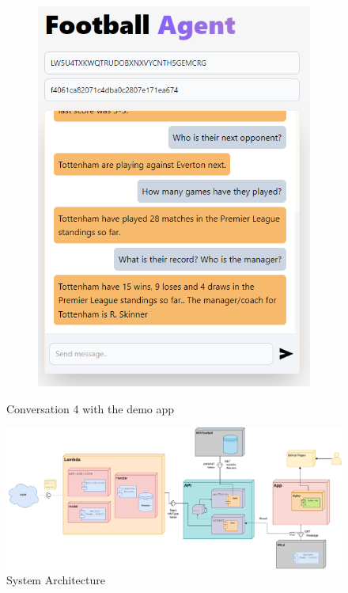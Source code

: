 \documentclass[10pt,a4paper,twocolumn]{article}
\begin{document}
\begin{figure}
\begin{subfigure}[b]{0.48\textwidth}
        \includegraphics[width=\textwidth]{assets/Screenshot_12.png}
    \end{subfigure}
    \caption*{Conversation 4 with the demo app}
\end{figure}

\begin{figure}
    \centering
    \includegraphics[width=\textwidth]{assets/architecture.pdf}
    \caption*{System Architecture}
\end{figure}
\end{document}
